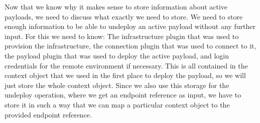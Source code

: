 Now that we know why it makes sense to store information about active payloads, we need to discuss what exactly we need to store.
We need to store enough information to be able to undeploy an active payload without any further input.
For this we need to know: The infrastructure plugin that was used to provision the infrastructure, the connection plugin that was used to connect to it, the payload plugin that was used to deploy the active payload, and login credentials for the remote environment if necessary.
This is all contained in the context object that we used in the first place to deploy the payload, so we will just store the whole context object.
Since we also use this storage for the undeploy operation, where we get an endpoint reference as input, we have to store it in such a way that we can map a particular context object to the provided endpoint reference.
